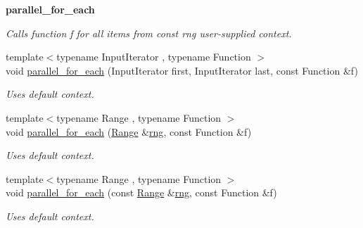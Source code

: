 \begin{Indent}{\bf parallel\+\_\+for\+\_\+each}
\begin{DoxyCompactItemize}
\begin{DoxyCompactList}\small\item\em Calls function f for all items from const rng user-\/supplied context. \end{DoxyCompactList}\item 
\hypertarget{group__algorithms_gaef59e9baf9141a19c99a291e4532bd98}{}{\footnotesize template$<$typename Input\+Iterator , typename Function $>$ }\\void \hyperlink{group__algorithms_gaef59e9baf9141a19c99a291e4532bd98}{parallel\+\_\+for\+\_\+each} (Input\+Iterator first, Input\+Iterator last, const Function \&f)\label{group__algorithms_gaef59e9baf9141a19c99a291e4532bd98}

\begin{DoxyCompactList}\small\item\em Uses default context. \end{DoxyCompactList}\item 
\hypertarget{group__algorithms_ga5868cd01f2126b139ab5809f64632db1}{}{\footnotesize template$<$typename Range , typename Function $>$ }\\void \hyperlink{group__algorithms_ga5868cd01f2126b139ab5809f64632db1}{parallel\+\_\+for\+\_\+each} (\hyperlink{classtbb_1_1blocked__range}{Range} \&\hyperlink{structrng}{rng}, const Function \&f)\label{group__algorithms_ga5868cd01f2126b139ab5809f64632db1}

\begin{DoxyCompactList}\small\item\em Uses default context. \end{DoxyCompactList}\item 
\hypertarget{group__algorithms_ga33463c8b0d0104cf9d9e0f9cb3c0b26b}{}{\footnotesize template$<$typename Range , typename Function $>$ }\\void \hyperlink{group__algorithms_ga33463c8b0d0104cf9d9e0f9cb3c0b26b}{parallel\+\_\+for\+\_\+each} (const \hyperlink{classtbb_1_1blocked__range}{Range} \&\hyperlink{structrng}{rng}, const Function \&f)\label{group__algorithms_ga33463c8b0d0104cf9d9e0f9cb3c0b26b}

\begin{DoxyCompactList}\small\item\em Uses default context. \end{DoxyCompactList}\end{DoxyCompactItemize}
\end{Indent}
